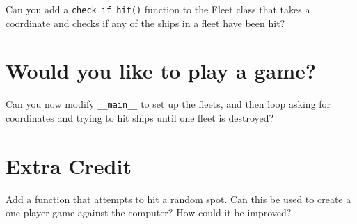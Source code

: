 \documentclass[12pt,oneside]{cttutorial}
\begin{document}
Can you add a \lstinline!check_if_hit()! function to the Fleet class that takes a coordinate and checks if any of the ships in a fleet have been hit?

\section{Would you like to play a game?}

Can you now modify \lstinline!__main__! to set up the fleets, and then loop asking for coordinates and trying to hit ships until one fleet is destroyed?


\section{Extra Credit}

Add a function that attempts to hit a random spot. Can this be used to
create a one player game against the computer? How could it be improved?
\end{document}
